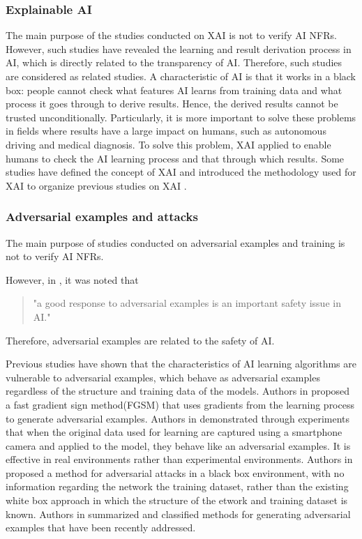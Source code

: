 \documentclass[journal,article,submit,moreauthors,pdftex]{Definitions/mdpi}
\begin{document}
\subsubsection{Explainable AI}

The main purpose of the studies conducted on XAI is not to verify AI NFRs.
However, such studies have revealed the learning and result derivation process in AI, which is directly related to the transparency of AI. Therefore, such studies are considered as related studies.
A characteristic of AI is that it works in a black box: people cannot check what features AI learns from training data and what process it goes through to derive results.
Hence, the derived results cannot be trusted unconditionally.
Particularly, it is more important to solve these problems in fields where results have a large impact on humans, such as autonomous driving and medical diagnosis.
To solve this problem, XAI applied to enable humans to check the AI learning process and that through which results.
Some studies have defined the concept of XAI and introduced the methodology used for XAI to organize previous studies on XAI\cite{xai-samek, xai-arrieta,ai-medical-xai-holzinger,xai-transparency-ribeiro,xai-transparency-murdoch} .

\subsubsection{Adversarial examples and attacks}

The main purpose of studies conducted on adversarial examples and training is not to verify AI NFRs.

However, in \cite{adversarial-kurakin}, it was noted that
\begin{quote}
   "a good response to adversarial examples is an important safety issue in AI."
\end{quote}
Therefore, adversarial examples are related to the safety of AI.

Previous studies have shown that the characteristics of AI learning algorithms are vulnerable to adversarial examples, which behave as adversarial examples regardless of the structure and training data of the models\cite{adversarial-szegedy,adversarial-goodfellow}.
Authors in \cite{adversarial-goodfellow} proposed a fast gradient sign method(FGSM) that uses gradients from the learning process to generate adversarial examples.
Authors in \cite{adversarial-kurakin2} demonstrated through experiments that when the original data used for learning are captured using a smartphone camera and applied to the model, they behave like an adversarial examples. It is effective in real environments rather than experimental environments.
Authors in \cite{adversarial-papernot} proposed a method for adversarial attacks in a black box environment, with no information regarding the network the training dataset, rather than the existing white box approach in which the structure of the etwork and training dataset is known.
Authors in \cite{adversarial-yuan} summarized and classified methods for generating adversarial examples that have been recently addressed.
\end{document}
